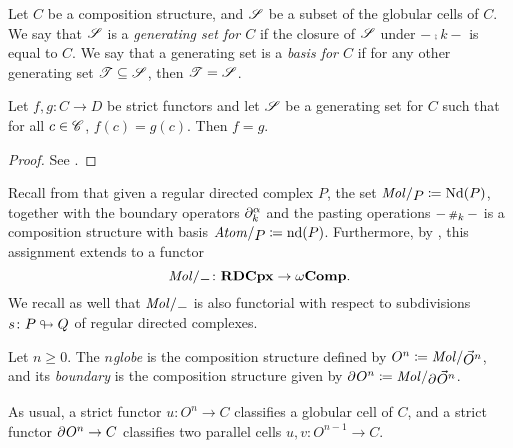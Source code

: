 \begin{dfn} 
    Let \( C \) be a composition structure, and \( \mathscr{S} \) be a subset of the globular cells of \( C \).
    We say that \( \mathscr{S} \) is a \emph{generating set for \( C \)} if the closure of \( \mathscr{S} \) under \( - \comp{k} - \) is equal to \( C \).
    We say that a generating set is a \emph{basis for \( C \)} if for any other generating set \( \mathscr{T} \subseteq \mathscr{S} \), then \( \mathscr{T} = \mathscr{S} \).
\end{dfn}

\begin{lem}\label{lem:strict_functor_determined_by_basis}
    Let \( f, g \colon C \to D \) be strict functors and let \( \mathscr{S} \) be a generating set for \( C \) such that for all \( c \in \mathscr{C} \), \( f(c) = g(c) \).
    Then \( f = g \).
\end{lem}
\begin{proof}
    See \cite[Lemma 5.1.23]{hadzihasanovic2024combinatorics}.
\end{proof}

\noindent Recall from \cite[section 5.2]{hadzihasanovic2024combinatorics} that given a regular directed complex \( P \), the set \( \molecin{P} \eqdef \Nd(P) \), together with the boundary operators \( \partial_{k}^{\alpha} \) and the pasting operations \( - \,{\scriptstyle\#}_{k}\, - \) is a composition structure with basis \( \atomin{P} \eqdef \nd(P) \).
Furthermore, by \cite[Theorem 6.2.32]{hadzihasanovic2024combinatorics}, this assignment extends to a functor
\begin{equation*}
    \molecin{-} \colon \rdcpx \to \Comp.
\end{equation*}
We recall as well that \( \molecin{-} \) is also functorial with respect to subdivisions \( s \colon P \looparrowright Q \) of regular directed complexes.

\begin{dfn} [Globe]
    Let \( n \geq 0 \).
    The \emph{\( n \)\nbd globe} is the composition structure defined by \( \globe{n} \eqdef \molecin{\dglobe{n}} \), and its \emph{boundary} is the composition structure given by \( \bd{}{}\globe{n} \eqdef \molecin{\bd{}{}\dglobe{n}} \).
\end{dfn}

\begin{rmk}
    As usual, a strict functor \( u \colon O^n \to C \) classifies a globular cell of \( C \), and a strict functor \( \partial_{}^{} O^n \to C \) classifies two parallel cells \( u, v \colon O^{n - 1} \to C \).
\end{rmk}

